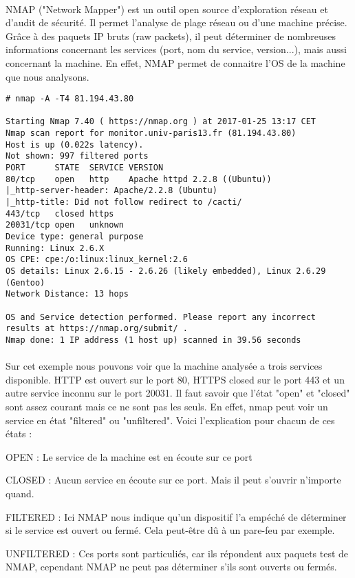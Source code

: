 \documentclass[12pt]{report}
\begin{document}
		\paragraph{}
			NMAP ("Network Mapper") est un outil open source d'exploration réseau et d'audit de sécurité. Il permet l'analyse de plage réseau ou d'une machine précise. Grâce à des paquets IP bruts (raw packets), il peut déterminer de nombreuses informations concernant les services (port, nom du service, version...), mais aussi concernant la machine. En effet, NMAP permet de connaitre l'OS de la machine que nous analysons.
			\begin{lstlisting}[caption=Scan NMAP, captionpos=b]
# nmap -A -T4 81.194.43.80

Starting Nmap 7.40 ( https://nmap.org ) at 2017-01-25 13:17 CET
Nmap scan report for monitor.univ-paris13.fr (81.194.43.80)
Host is up (0.022s latency).
Not shown: 997 filtered ports
PORT      STATE  SERVICE VERSION
80/tcp    open   http    Apache httpd 2.2.8 ((Ubuntu))
|_http-server-header: Apache/2.2.8 (Ubuntu)
|_http-title: Did not follow redirect to /cacti/
443/tcp   closed https
20031/tcp open   unknown
Device type: general purpose
Running: Linux 2.6.X
OS CPE: cpe:/o:linux:linux_kernel:2.6
OS details: Linux 2.6.15 - 2.6.26 (likely embedded), Linux 2.6.29 (Gentoo)
Network Distance: 13 hops

OS and Service detection performed. Please report any incorrect results at https://nmap.org/submit/ .
Nmap done: 1 IP address (1 host up) scanned in 39.56 seconds
			\end{lstlisting}
			\paragraph{}
				Sur cet exemple nous pouvons voir que la machine analysée a trois services disponible. HTTP est ouvert sur le port 80, HTTPS closed sur le port 443 et un autre service inconnu sur le port 20031. Il faut savoir que l'état "open" et "closed" sont assez courant mais ce ne sont pas les seuls. En effet, nmap peut voir un service en état "filtered" ou "unfiltered". Voici l'explication pour chacun de ces états :
			\begin{description}
			\item OPEN : Le service de la machine est en écoute sur ce port
			\item CLOSED : Aucun service en écoute sur ce port. Mais il peut s'ouvrir n'importe quand.
			\item FILTERED : Ici NMAP nous indique qu'un dispositif l'a empéché de déterminer si le service est ouvert ou fermé. Cela peut-être dû à un pare-feu par exemple.
			\item UNFILTERED : Ces ports sont particuliés, car ils répondent aux paquets test de NMAP, cependant NMAP ne peut pas déterminer s'ils sont ouverts ou fermés.
			\end{description}
\end{document}
